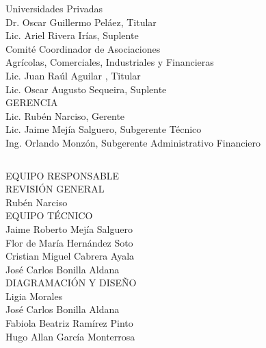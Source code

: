 {\begin{center}
		
		{\Bold Universidades Privadas}\\
		Dr. Oscar Guillermo Peláez, Titular\\
		Lic. Ariel Rivera Irías, Suplente\\[0.4cm]
		
		
		{\Bold Comité Coordinador de Asociaciones\\ Agrícolas, Comerciales, Industriales y Financieras}\\
		Lic. Juan Raúl Aguilar , Titular\\
		Lic. Oscar Augusto Sequeira, Suplente\\[0.8cm]
		
		
		{\Bold \large \color{color1!89!black} GERENCIA}\\[0.2cm]
		Lic. Rubén Narciso, Gerente\\
		Lic. Jaime Mejía Salguero, Subgerente Técnico\\
		Ing. Orlando Monzón, Subgerente Administrativo Financiero\\
		
		
	\end{center}
}{}
\clearpage

$\ $
\vspace{2cm}

\begin{center}
	{\Bold \LARGE EQUIPO RESPONSABLE}\\[2cm]
	
	{\Bold \large \color{color1!89!black} REVISIÓN GENERAL}\\[0.2cm]
	Rubén Narciso\\[0.8cm]
	
	
	{\Bold \large \color{color1!89!black} EQUIPO TÉCNICO}\\[0.2cm]
	Jaime Roberto Mejía Salguero\\
	Flor de María Hernández Soto\\
	Cristian Miguel Cabrera Ayala\\
	

	José Carlos Bonilla Aldana\\[0.8cm]
	
	{\Bold \large \color{color1!89!black} DIAGRAMACIÓN Y DISEÑO}\\[0.2cm]
	Ligia Morales\\
	José Carlos Bonilla Aldana\\
	Fabiola Beatriz Ramírez Pinto\\
	Hugo Allan García Monterrosa\\[0.8cm]
	
	
	
\end{center}\setcounter{page}{0}\cleardoublepage




